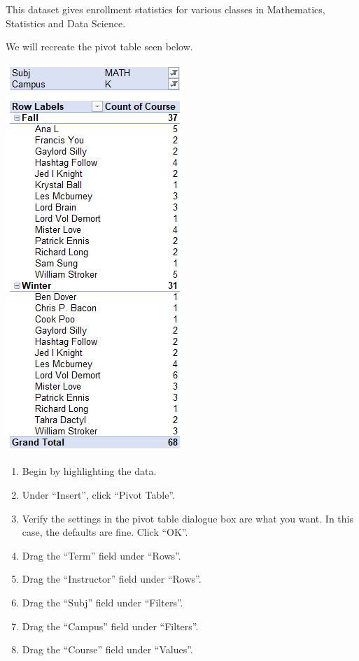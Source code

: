 \documentclass[
]{book}
\providecommand{\tightlist}{%
  \setlength{\itemsep}{0pt}\setlength{\parskip}{0pt}}
\begin{document}
This dataset gives enrollment statistics for various classes in Mathematics, Statistics and Data Science.

We will recreate the pivot table seen below.

\includegraphics{PT2.png}

\begin{enumerate}
\def\labelenumi{\arabic{enumi}.}
\tightlist
\item
  Begin by highlighting the data.
\item
  Under ``Insert'', click ``Pivot Table''.
\item
  Verify the settings in the pivot table dialogue box are what you want. In this case, the defaults are fine. Click ``OK''.
\item
  Drag the ``Term'' field under ``Rows''.
\item
  Drag the ``Instructor'' field under ``Rows''.
\item
  Drag the ``Subj'' field under ``Filters''.
\item
  Drag the ``Campus'' field under ``Filters''.
\item
  Drag the ``Course'' field under ``Values''.
\end{enumerate}
\end{document}
